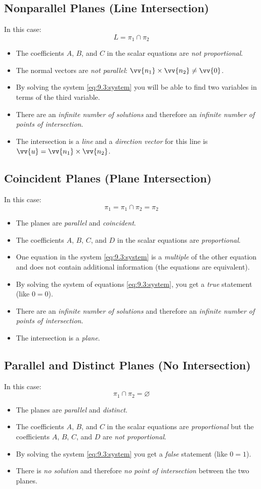 \subsection{Nonparallel Planes (Line Intersection)}
	In this case:
	\[L = \pi_1 \cap \pi_2\]
	\begin{itemize}
		\item The coefficients $A$, $B$, and $C$ in the scalar equations are \emph{not proportional}.
		\item The normal vectors are \emph{not parallel}: $\vv{n_1} \times \vv{n_2} \neq \vv{0}$.
		\item By solving the system \eqref{eq:9.3:system} you will be able to find two variables in terms of the third variable.
		\item There are an \emph{infinite number of solutions} and therefore an \emph{infinite number of points of intersection}.
		\item The intersection is a \emph{line} and a \emph{direction vector} for this line is $\vv{u} = \vv{n_1} \times \vv{n_2}$.
	\end{itemize}
\subsection{Coincident Planes (Plane Intersection)}
	In this case:
	\[\pi_1 = \pi_1 \cap \pi_2 = \pi_2\]
	\begin{itemize}
		\item The planes are \emph{parallel} and \emph{coincident}.
		\item The coefficients $A$, $B$, $C$, and $D$ in the scalar equations are \emph{proportional}.
		\item One equation in the system \eqref{eq:9.3:system} is a \emph{multiple} of the other equation and does not contain additional information (the equations are equivalent).
		\item By solving the system of equations \eqref{eq:9.3:system}, you get a \emph{true} statement (like $0 = 0$).
		\item There are an \emph{infinite number of solutions} and therefore an \emph{infinite number of points of intersection}.
		\item The intersection is a \emph{plane}.
	\end{itemize}
\subsection{Parallel and Distinct Planes (No Intersection)}
	In this case:
	\[\pi_1 \cap \pi_2 = \varnothing\]
	\begin{itemize}
		\item The planes are \emph{parallel} and \emph{distinct}.
		\item The coefficients $A$, $B$, and $C$ in the scalar equations are \emph{proportional} but the coefficients $A$, $B$, $C$, and $D$ are \emph{not proportional}.
		\item By solving the system \eqref{eq:9.3:system} you get a \emph{false} statement (like $0 = 1$).
		\item There is \emph{no solution} and therefore \emph{no point of intersection} between the two planes.
	\end{itemize}
